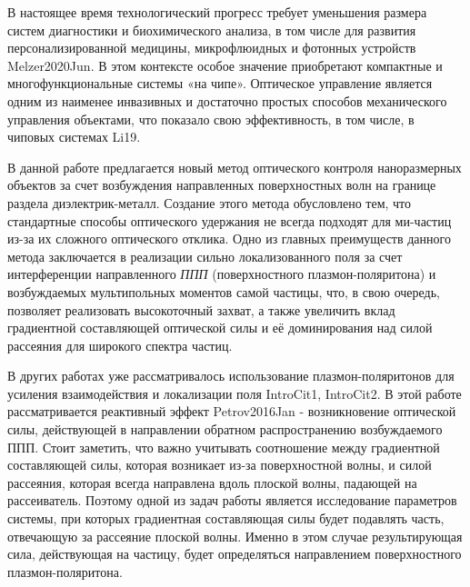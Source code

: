 \startprefacepage


В настоящее время технологический прогресс требует уменьшения размера систем диагностики и биохимического анализа, в том числе для развития персонализированной медицины, микрофлюидных и фотонных устройств Melzer2020Jun. В этом контексте особое значение приобретают компактные и многофункциональные системы «на чипе». Оптическое управление является одним из наименее инвазивных и достаточно простых способов механического управления объектами, что показало свою эффективность, в том числе, в чиповых системах Li19. 

В данной работе предлагается новый метод оптического контроля наноразмерных объектов за счет возбуждения направленных поверхностных волн на границе раздела диэлектрик-металл. Создание этого метода обусловлено тем, что стандартные способы оптического удержания не всегда подходят для ми-частиц из-за их сложного оптического отклика. Одно из главных преимуществ данного метода заключается в реализации сильно локализованного поля за счет интерференции направленного \textit{ППП} (поверхностного плазмон-поляритона) и возбуждаемых мультипольных моментов самой частицы, что, в свою очередь, позволяет реализовать высокоточный захват, а также увеличить вклад градиентной составляющей оптической силы и её доминирования над силой рассеяния для широкого спектра частиц.

В других работах уже рассматривалось использование плазмон-поляритонов для усиления взаимодействия и локализации поля IntroCit1, IntroCit2. В этой работе рассматривается реактивный эффект Petrov2016Jan - возникновение оптической силы, действующей в направлении обратном распространению возбуждаемого ППП. Стоит заметить, что важно учитывать соотношение между градиентной составляющей силы, которая возникает из-за поверхностной волны, и силой рассеяния, которая всегда направлена вдоль плоской волны, падающей на рассеиватель. Поэтому одной из задач работы является исследование параметров системы, при которых градиентная составляющая силы будет подавлять часть, отвечающую за рассеяние плоской волны. Именно в этом случае результирующая сила, действующая на частицу, будет определяться направлением поверхностного плазмон-поляритона. 

